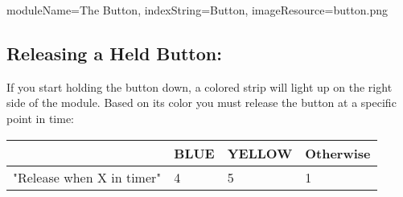 \documentclass{../../ktane-mod}
\begin{document}
\begin{module}{
  moduleName=The Button,
  indexString=Button,
  imageResource=button.png
}
  \subsection*{Releasing a Held Button:}
  If you start holding the button down, a colored strip will light up on the right side of the module.
  Based on its color you must release the button at a specific point in time:

  \begin{NiceTabular}{|
      >{\centering\arraybackslash}p{4.3cm} |
      >{\centering\arraybackslash}p{3.9cm} |
      >{\centering\arraybackslash}p{3.5cm} |
      >{\centering\arraybackslash}p{3.5cm} |}
    \hline
     &
    BLUE &
    YELLOW &
    Otherwise \\

    \hline
    "Release when X in timer" &
    \vspace{0cm}4 &
    \vspace{0cm}5 &
    \vspace{0cm}1 \\
    \hline
  \end{NiceTabular}

\end{module}
\end{document}
